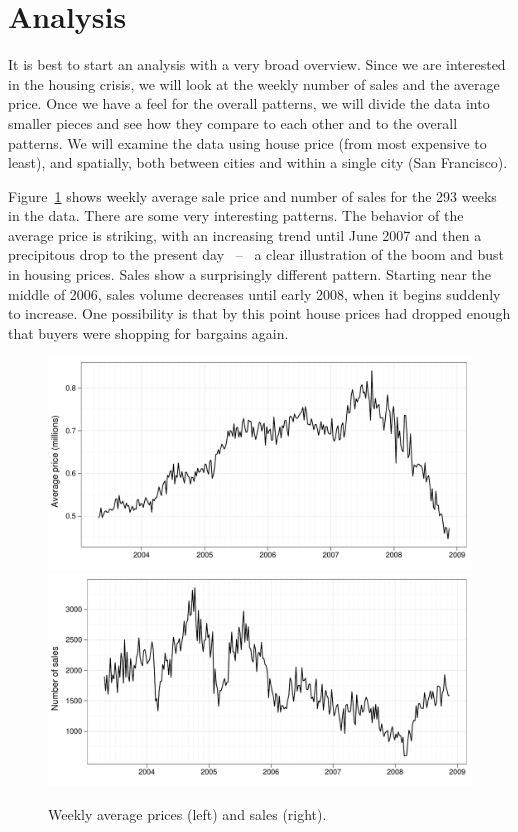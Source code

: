 \documentclass[oneside]{article}
\begin{document}
\section{Analysis}

It is best to start an analysis with a very broad overview.  Since we are interested in the housing crisis, we will look at the weekly number of sales and the average price.  Once we have a feel for the overall patterns, we will divide the data into smaller pieces and see how they compare to each other and to the overall patterns.  We will examine the data using house price (from most expensive to least), and spatially, both between cities and within a single city (San Francisco).


Figure~\ref{fig:daily} shows weekly average sale price and number of sales for the 293 weeks in the data.  There are some very interesting patterns.  The behavior of the average price is striking, with an increasing trend until June 2007 and then a precipitous drop to the present day ~--~ a clear illustration of the boom and bust in housing prices.  Sales show a surprisingly different pattern.  Starting near the middle of 2006, sales volume decreases until early 2008, when it begins suddenly to increase. One possibility is that by this point house prices had dropped enough that buyers were shopping for bargains again.

\begin{figure}[htbp]
  \centering
    \includegraphics[width=0.5 \linewidth]{daily-price}%
    \includegraphics[width=0.5 \linewidth]{daily-sales}%
  \caption{Weekly average prices (left) and sales (right).}
  \label{fig:daily}
\end{figure}
\end{document}
